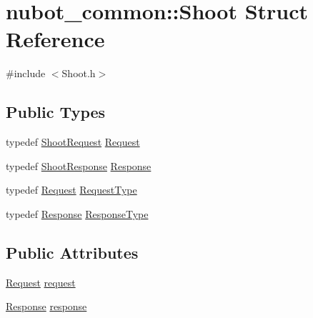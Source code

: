 \hypertarget{structnubot__common_1_1Shoot}{\section{nubot\-\_\-common\-:\-:Shoot Struct Reference}
\label{structnubot__common_1_1Shoot}
}


{\ttfamily \#include $<$Shoot.\-h$>$}

\subsection*{Public Types}
\begin{DoxyCompactItemize}
\item 
typedef \hyperlink{namespacenubot__common_ae80d20ffb44fb7b8c15ae5efb75aed2a}{Shoot\-Request} \hyperlink{structnubot__common_1_1Shoot_a8d200603298d1fe7377f13911e7d5bdc}{Request}
\item 
typedef \hyperlink{namespacenubot__common_a1561f4f368f1842d112eda1c185772d4}{Shoot\-Response} \hyperlink{structnubot__common_1_1Shoot_a4d609a5e9faac9c7c0d32b7cf0eb5738}{Response}
\item 
typedef \hyperlink{structnubot__common_1_1Shoot_a8d200603298d1fe7377f13911e7d5bdc}{Request} \hyperlink{structnubot__common_1_1Shoot_a00fabefc36af40105d07c4ad3373f0e2}{Request\-Type}
\item 
typedef \hyperlink{structnubot__common_1_1Shoot_a4d609a5e9faac9c7c0d32b7cf0eb5738}{Response} \hyperlink{structnubot__common_1_1Shoot_a7a2ab7b3d778ea57959a3f760ca447ea}{Response\-Type}
\end{DoxyCompactItemize}
\subsection*{Public Attributes}
\begin{DoxyCompactItemize}
\item 
\hyperlink{structnubot__common_1_1Shoot_a8d200603298d1fe7377f13911e7d5bdc}{Request} \hyperlink{structnubot__common_1_1Shoot_a928906d0aad7d7ced9018bc3a29dfdcf}{request}
\item 
\hyperlink{structnubot__common_1_1Shoot_a4d609a5e9faac9c7c0d32b7cf0eb5738}{Response} \hyperlink{structnubot__common_1_1Shoot_ad087c631d279c2f929abf994fc814db5}{response}
\end{DoxyCompactItemize}


